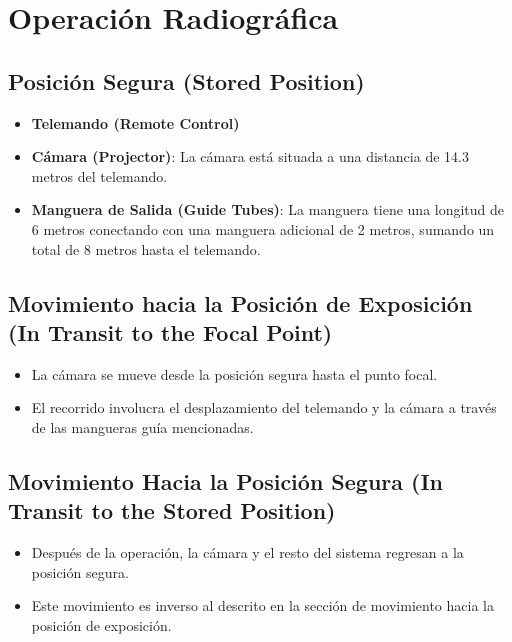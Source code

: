 \section*{Operación Radiográfica}

\subsection*{Posición Segura (Stored Position)}
\begin{itemize}
    \item \textbf{Telemando (Remote Control)}
    \item \textbf{Cámara (Projector)}: La cámara está situada a una distancia de 14.3 metros del telemando.
    \item \textbf{Manguera de Salida (Guide Tubes)}: La manguera tiene una longitud de 6 metros conectando con una manguera adicional de 2 metros, sumando un total de 8 metros hasta el telemando.
\end{itemize}

\subsection*{Movimiento hacia la Posición de Exposición (In Transit to the Focal Point)}
\begin{itemize}
    \item La cámara se mueve desde la posición segura hasta el punto focal.
    \item El recorrido involucra el desplazamiento del telemando y la cámara a través de las mangueras guía mencionadas.
\end{itemize}

\subsection*{Movimiento Hacia la Posición Segura (In Transit to the Stored Position)}
\begin{itemize}
    \item Después de la operación, la cámara y el resto del sistema regresan a la posición segura.
    \item Este movimiento es inverso al descrito en la sección de movimiento hacia la posición de exposición.
\end{itemize}